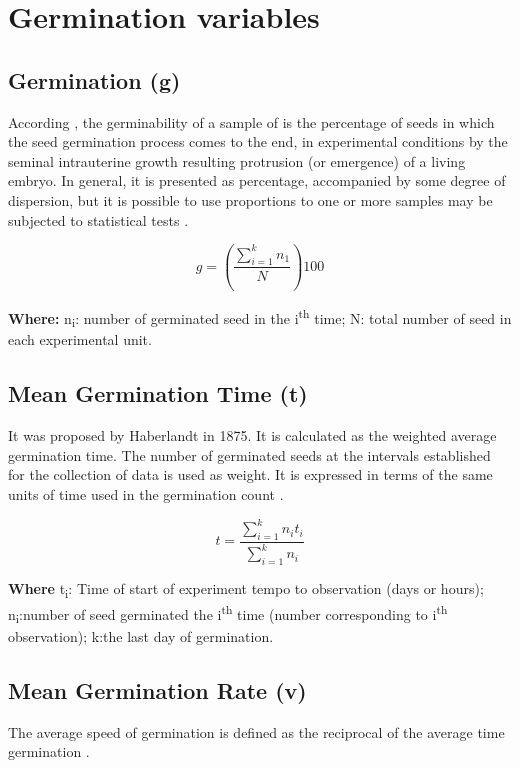 \documentclass[]{book}
\begin{document}
\chapter{Germination variables}\label{germination-variables}

\section{Germination (g)}\label{germination-g}

According \citet{GouveaLabouriau1983}, the germinability of a sample of
is the percentage of seeds in which the seed germination process comes
to the end, in experimental conditions by the seminal intrauterine
growth resulting protrusion (or emergence) of a living embryo. In
general, it is presented as percentage, accompanied by some degree of
dispersion, but it is possible to use proportions to one or more samples
may be subjected to statistical tests \citep{CARVALHO2005}.

\[ g=\left(\frac{\sum_{i=1}^kn_1}{N}\right)100 \]

\textbf{Where:} n\textsubscript{i}: number of germinated seed in the
i\textsuperscript{th} time; N: total number of seed in each experimental
unit.

\section{Mean Germination Time (t)}\label{mean-germination-time-t}

It was proposed by Haberlandt in 1875. It is calculated as the weighted
average germination time. The number of germinated seeds at the
intervals established for the collection of data is used as weight. It
is expressed in terms of the same units of time used in the germination
count \citep{Czabator1962}.

\[ t=\frac{\sum_{i=1}^kn_it_i}{\sum_{i=1}^kn_i} \]

\textbf{Where} t\textsubscript{i}: Time of start of experiment tempo to
observation (days or hours); n\textsubscript{i}:number of seed
germinated the i\textsuperscript{th} time (number corresponding to
i\textsuperscript{th} observation); k:the last day of germination.

\section{Mean Germination Rate (v)}\label{mean-germination-rate-v}

The average speed of germination is defined as the reciprocal of the
average time germination \citep{Ranal2006}.
\end{document}
